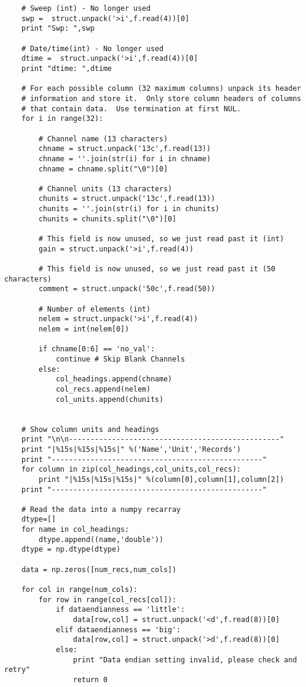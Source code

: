\begin{lstlisting}
    # Sweep (int) - No longer used
    swp =  struct.unpack('>i',f.read(4))[0]
    print "Swp: ",swp
    
    # Date/time(int) - No longer used
    dtime =  struct.unpack('>i',f.read(4))[0]
    print "dtime: ",dtime
    
    # For each possible column (32 maximum columns) unpack its header
    # information and store it.  Only store column headers of columns
    # that contain data.  Use termination at first NUL.
    for i in range(32):
    
        # Channel name (13 characters)
        chname = struct.unpack('13c',f.read(13))
        chname = ''.join(str(i) for i in chname)
        chname = chname.split("\0")[0] 
        
        # Channel units (13 characters)
        chunits = struct.unpack('13c',f.read(13))
        chunits = ''.join(str(i) for i in chunits)
        chunits = chunits.split("\0")[0]
    
        # This field is now unused, so we just read past it (int)
        gain = struct.unpack('>i',f.read(4))
        
        # This field is now unused, so we just read past it (50 characters)
        comment = struct.unpack('50c',f.read(50))

        # Number of elements (int)
        nelem = struct.unpack('>i',f.read(4))
        nelem = int(nelem[0])
        
        if chname[0:6] == 'no_val':
            continue # Skip Blank Channels
        else:
            col_headings.append(chname)
            col_recs.append(nelem)
            col_units.append(chunits)
    
    
    # Show column units and headings
    print "\n\n-------------------------------------------------"
    print "|%15s|%15s|%15s|" %('Name','Unit','Records')
    print "-------------------------------------------------"
    for column in zip(col_headings,col_units,col_recs):
        print "|%15s|%15s|%15s|" %(column[0],column[1],column[2])
    print "-------------------------------------------------"
    
    # Read the data into a numpy recarray
    dtype=[]
    for name in col_headings:
        dtype.append((name,'double'))
    dtype = np.dtype(dtype)
    
    data = np.zeros([num_recs,num_cols])
    
    for col in range(num_cols):
        for row in range(col_recs[col]):
            if dataendianness == 'little':
                data[row,col] = struct.unpack('<d',f.read(8))[0]
            elif dataendianness == 'big':
                data[row,col] = struct.unpack('>d',f.read(8))[0]
            else:
                print "Data endian setting invalid, please check and retry"
                return 0


\end{lstlisting}
